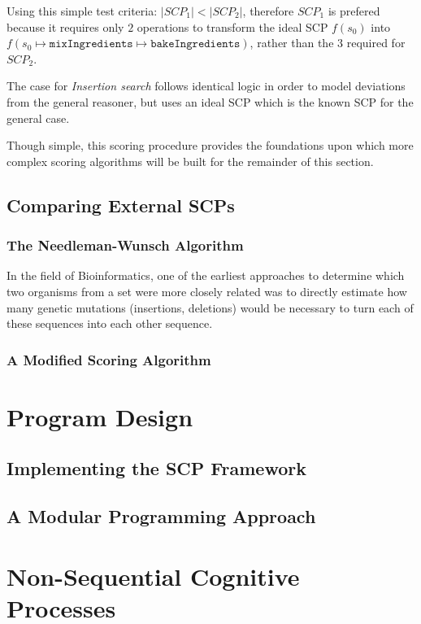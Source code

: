 \documentclass[
11pt, %
english, %
singlespacing, %
headsepline, %
]{MastersDoctoralThesis} %
\begin{document}
Using this simple test criteria: $|SCP_1| < |SCP_2|$, therefore $SCP_1$ is prefered because it requires only $2$ operations to transform the ideal SCP $f(s_0)$ into $f(s_0\longmapsto \texttt{mixIngredients} \longmapsto \texttt{bakeIngredients})$, rather than the $3$ required for $SCP_2$.

The case for \textit{Insertion search} follows identical logic in order to model deviations from the general reasoner, but uses an ideal SCP which is the known SCP for the general case.

Though simple, this scoring procedure provides the foundations upon which more complex scoring algorithms will be built for the remainder of this section.

\section{Comparing External SCPs} \label{ssec:compExt}
\subsection{The Needleman-Wunsch Algorithm} \label{ssec:nw}
In the field of Bioinformatics, one of the earliest approaches to determine which two organisms from a set were more closely related was to directly estimate how many genetic mutations (insertions, deletions) would be necessary to turn each of these sequences into each other sequence.

\subsection{A Modified Scoring Algorithm} \label{ssec:nw_mod}


\chapter{Program Design}
\section{Implementing the SCP Framework}
\section{A Modular Programming Approach}




\chapter{Non-Sequential Cognitive Processes}
\end{document}
